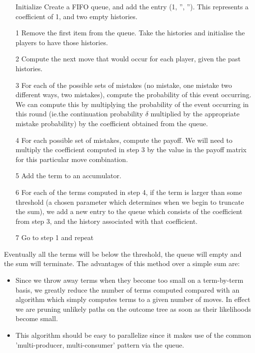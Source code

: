 \documentclass[a4paper,11pt]{article}
\begin{document}
\begin{enumerate}
    \item[Initialize] Create a FIFO queue, and add the entry (1, '', ''). This represents a coefficient of 1, and two empty histories.
    \item[1] Remove the first item from the queue. Take the histories and initialise the players to have those histories.
    \item[2] Compute the next move that would occur for each player, given the past histories.
    \item[3] For each of the possible sets of mistakes (no mistake, one mistake two different ways, two mistakes), compute the probability of this event occurring. We can compute this by multiplying the probability of the event occurring in this round (ie.the continuation probability $\delta$ multiplied by the appropriate mistake probability) by the coefficient obtained from the queue.
    \item[4] For each possible set of mistakes, compute the payoff. We will need to multiply the coefficient computed in step 3 by the value in the payoff matrix for this particular move combination.
    \item[5] Add the term to an accumulator.
    \item[6] For each of the terms computed in step 4, if the term is larger than some threshold (a chosen parameter which determines when we begin to truncate the sum), we add a new entry to the queue which consists of the coefficient from step 3, and the history associated with that coefficient.
    \item[7] Go to step 1 and repeat
\end{enumerate}

Eventually all the terms will be below the threshold, the queue will empty and the sum will terminate.
The advantages of this method over a simple sum are:

\begin{itemize}

    \item Since we throw away terms when they become too small on a term-by-term basis, we greatly reduce the number of terms computed compared with an algorithm which simply computes terms to a given number of moves. In effect we are pruning unlikely paths on the outcome tree as soon as their likelihoods become small.
    \item This algorithm should be easy to parallelize since it makes use of the common 'multi-producer, multi-consumer' pattern via the queue.

\end{itemize}
\end{document}
